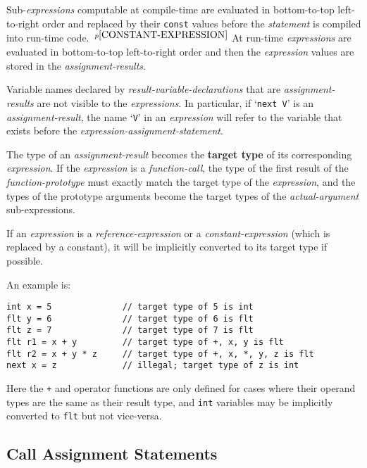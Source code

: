 \documentclass[12pt]{article}
\newcommand{\key}[1]{{\rm \bfseries #1}}
\newcommand{\pagnote}[1]{$\,^{p\pageref{#1}}$}
\newenvironment{indpar}[1][0.3in]%
	{\begin{list}{}%
		     {\setlength{\itemsep}{0in}%
		      \setlength{\topsep}{0in}%
		      \setlength{\parsep}{1ex}%
		      \setlength{\labelwidth}{#1}%
		      \setlength{\leftmargin}{#1}%
		      \addtolength{\leftmargin}{\labelsep}}%
	 \item}%
	{\end{list}}
\begin{document}
Sub-{\em expressions} computable at compile-time are evaluated
in bottom-to-top left-to-right order and replaced by their {\tt const} values
before the {\em statement} is compiled into run-time code.%
\pagnote{CONSTANT-EXPRESSION}
At run-time {\em expressions} are evaluated in bottom-to-top
left-to-right order and
then the {\em expression} values are stored in the {\em assignment-results}.

Variable names declared by {\em result-variable-declarations} that are
{\em assignment-results} are not visible to the {\em expressions}.
In particular, if `{\tt next V}' is an {\em assignment-result},
the name `{\tt V}' in an {\em expression} will refer to the variable
that exists before the {\em expression-assignment-statement}.

The type of an {\em assignment-result} becomes the \key{target type}
of its corresponding {\em expression}.  If the {\em expression}
is a {\em function-call}, the type of the first result of the
{\em function-prototype} must exactly match
the target type of the {\em expression},
and the types of the prototype arguments become the target types
of the {\em actual-argument} sub-expressions.

If an {\em expression} is a {\em reference-expression}
or a {\em constant-expression}
(which is replaced by a constant),
it will be implicitly
converted to its target type if possible.

An example is:
\begin{indpar}\begin{verbatim}
int x = 5              // target type of 5 is int
flt y = 6              // target type of 6 is flt
flt z = 7              // target type of 7 is flt
flt r1 = x + y         // target type of +, x, y is flt
flt r2 = x + y * z     // target type of +, x, *, y, z is flt
next x = z             // illegal; target type of z is int
\end{verbatim}\end{indpar}

Here the {\tt +} and {\tt *} operator functions are only defined
for cases where their operand types are the same as their result type,
and {\tt int} variables may be implicitly converted to {\tt flt}
but not vice-versa.

\subsection{Call Assignment Statements}
\label{CALL-ASSIGNMENT-STATEMENTS}
\end{document}

